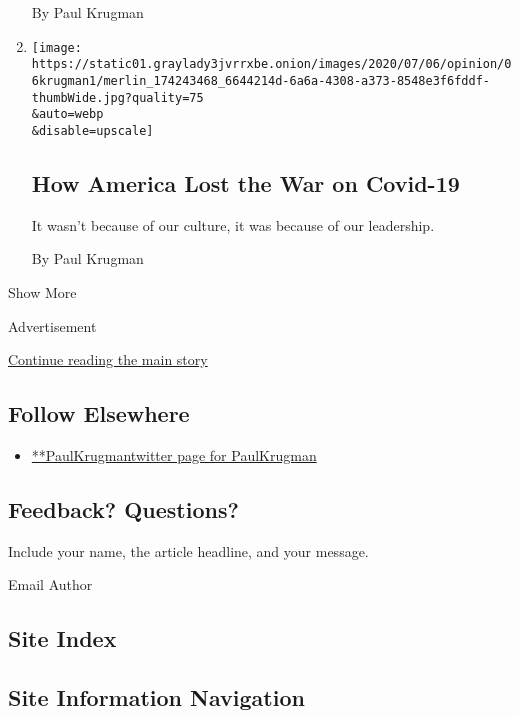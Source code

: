 \begin{enumerate}
  By Paul Krugman
\item
  \href{/2020/07/06/opinion/covid-19-trump.html}{}

  \texttt{[image: https://static01.graylady3jvrrxbe.onion/images/2020/07/06/opinion/06krugman1/merlin\_174243468\_6644214d-6a6a-4308-a373-8548e3f6fddf-thumbWide.jpg?quality=75\\\&auto=webp\\\&disable=upscale]}

  \hypertarget{how-america-lost-the-war-on-covid-19}{%
  \subsection{How America Lost the War on
  Covid-19}\label{how-america-lost-the-war-on-covid-19}}

  It wasn't because of our culture, it was because of our leadership.

  By Paul Krugman
\end{enumerate}

Show More

Advertisement

\protect\hyperlink{after-mid2}{Continue reading the main story}

\hypertarget{follow-elsewhere}{%
\subsection{Follow Elsewhere}\label{follow-elsewhere}}

\begin{itemize}
\tightlist
\item
  \href{https://twitter.com/PaulKrugman}{**PaulKrugmantwitter page for
  PaulKrugman}
\end{itemize}

\hypertarget{feedback-questions}{%
\subsection{Feedback? Questions?}\label{feedback-questions}}

Include your name, the article headline, and your message.

Email Author

\hypertarget{site-index}{%
\subsection{Site Index}\label{site-index}}

\hypertarget{site-information-navigation}{%
\subsection{Site Information
Navigation}\label{site-information-navigation}}

